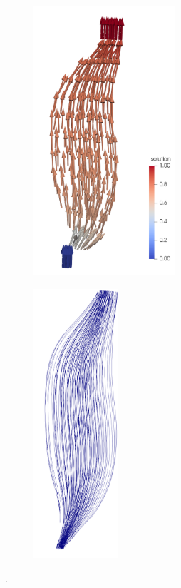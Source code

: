 \begin{figure}%
  \centering%
  \begin{subfigure}[t]{0.49\textwidth}%
    \centering%
    \includegraphics[height=10cm]{images/fiber_creation/potential_flow.png}%
    \caption{}%
    \label{fig:potential_flow}%
  \end{subfigure}
  \begin{subfigure}[t]{0.49\textwidth}%
    \centering%
    \includegraphics[height=10cm]{images/fiber_creation/streamlines.png}%
    \caption{}%
    \label{fig:streamlines}%
  \end{subfigure}
  \caption{.}%
  \label{fig:potential_flow_streamlines}%
\end{figure}%
%


